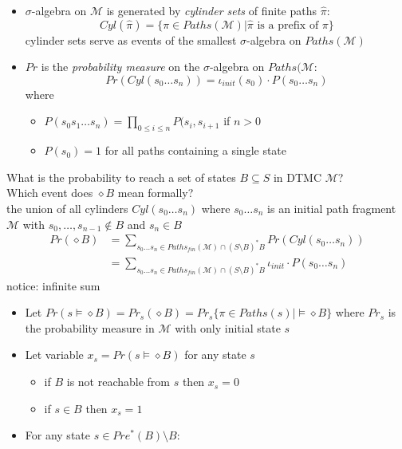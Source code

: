 \documentclass[a4paper, 10pt]{article}
\begin{document}
\begin{mdframed}
\begin{itemize}
    \item $\sigma$-algebra on $\mathcal{M}$ is generated by \emph{cylinder sets} of finite paths $\hat{\pi}$:
    \[ Cyl(\hat{\pi})=\{ \pi\in Paths(\mathcal{M}) | \hat{\pi} \text{ is a prefix of } \pi \} \]
    cylinder sets serve as events of the smallest $\sigma$-algebra on $Paths(\mathcal{M})$
    \item $Pr$ is the \emph{probability measure} on the $\sigma$-algebra on $Paths(\mathcal{M}$:
    \[ Pr(Cyl(s_0\dots s_n)) = \iota_{init}(s_0)\cdot P(s_0\dots s_n) \]
    where
    \begin{itemize}
        \item $P(s_0s_1\dots s_n) = \prod_{0\leq i\leq n} P(s_i,s_{i+1}$ if $n>0$
        \item $P(s_0)=1$ for all paths containing a single state
    \end{itemize}
\end{itemize}
What is the probability to reach a set of states $B\subseteq S$ in DTMC $\mathcal{M}$?
\\ Which event does $\diamond B$ mean formally?
\\ the union of all cylinders $Cyl(s_0\dots s_n)$ where $s_0\dots s_n$ is an initial path fragment $\mathcal{M}$ with $s_0,\dots,s_{n-1}\not\in B$ and $s_n\in B$
\begin{align*}
Pr(\diamond B) &= \sum_{s_0\dots s_n\in Paths_{fin}(\mathcal{M})\cap (S\setminus B)^* B} Pr(Cyl(s_0\dots s_n)) \\
 &= \sum_{s_0\dots s_n\in Paths_{fin}(\mathcal{M})\cap (S\setminus B)^* B} \iota_{init}\cdot P(s_0\dots s_n)
\end{align*}
{\tiny notice: infinite sum}
\begin{itemize}
    \item Let $Pr(s\models\diamond B) = Pr_s(\diamond B) = Pr_s\{\pi\in Paths(s) | \models \diamond B\}$ where $Pr_s$ is the probability measure in $\mathcal{M}$ with only initial state $s$
    \item Let variable $x_s=Pr(s\models\diamond B)$ for any state $s$
    \begin{itemize}
        \item if $B$ is not reachable from $s$ then $x_s=0$
        \item if $s\in B$ then $x_s=1$
    \end{itemize}
    \item For any state $s\in Pre^*(B)\setminus B:$

\end{itemize}
\end{mdframed}
\end{document}
